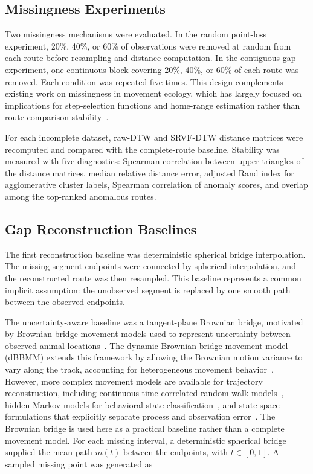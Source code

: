 \documentclass[pdflatex,sn-vancouver-num]{sn-jnl}
\begin{document}
\subsection{Missingness Experiments}\label{missingness-experiments}

Two missingness mechanisms were evaluated. In the random point-loss experiment, 20\%, 40\%, or 60\% of observations were removed at random from each route before resampling and distance computation. In the contiguous-gap experiment, one continuous block covering 20\%, 40\%, or 60\% of each route was removed. Each condition was repeated five times. This design complements existing work on missingness in movement ecology, which has largely focused on implications for step-selection functions and home-range estimation rather than route-comparison stability~\cite{hofmann2024,pozdnyakov2014}.

For each incomplete dataset, raw-DTW and SRVF-DTW distance matrices were recomputed and compared with the complete-route baseline. Stability was measured with five diagnostics: Spearman correlation between upper triangles of the distance matrices, median relative distance error, adjusted Rand index for agglomerative cluster labels, Spearman correlation of anomaly scores, and overlap among the top-ranked anomalous routes.

\subsection{Gap Reconstruction Baselines}\label{gap-reconstruction-baselines}

The first reconstruction baseline was deterministic spherical bridge interpolation. The missing segment endpoints were connected by spherical interpolation, and the reconstructed route was then resampled. This baseline represents a common implicit assumption: the unobserved segment is replaced by one smooth path between the observed endpoints.

The uncertainty-aware baseline was a tangent-plane Brownian bridge, motivated by Brownian bridge movement models used to represent uncertainty between observed animal locations~\cite{horne2007}. The dynamic Brownian bridge movement model (dBBMM) extends this framework by allowing the Brownian motion variance to vary along the track, accounting for heterogeneous movement behavior~\cite{kranstauber2012}. However, more complex movement models are available for trajectory reconstruction, including continuous-time correlated random walk models~\cite{calabrese2016}, hidden Markov models for behavioral state classification~\cite{michelot2016,mcclintock2018}, and state-space formulations that explicitly separate process and observation error~\cite{patterson2008,pozdnyakov2014}. The Brownian bridge is used here as a practical baseline rather than a complete movement model. For each missing interval, a deterministic spherical bridge supplied the mean path $m(t)$ between the endpoints, with $t\in[0,1]$. A sampled missing point was generated as
\end{document}
